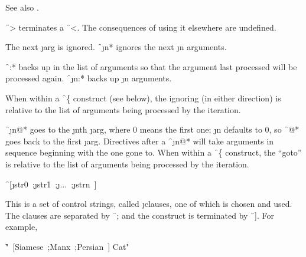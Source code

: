 See also \secref\TildeLessThanLogicalBlock.

\endsubsubsection%




\f{~>} terminates a \f{~<}.
The consequences of using it elsewhere are undefined.

\endsubsubsection%

\endsubsection%




                                                
The next \j{arg} is ignored.
\f{~\j{n}*} ignores the next \j{n} arguments.


\f{~:*} backs up in the list of
arguments so that the argument last processed will be processed again.
\f{~\j{n}:*} backs up \j{n} arguments.


When within a \f{~\{} construct
(see below), the ignoring (in either direction) is relative to the list
of arguments being processed by the iteration.


\f{~\j{n}@*} 
goes to the \j{n}th \j{arg}, where 0 means the first one;
\j{n} defaults to 0, so \f{~@*} goes back to the first \j{arg}.      
Directives after a \f{~\j{n}@*}
will take arguments in sequence beginning with the one gone to.
When within a \f{~\{} construct, the ``goto''
is relative to the list of arguments being processed by the iteration.

\endsubsubsection%



\f{~[\j{str0}~;\j{str1}~;\j{...}~;\j{strn}~]}

This is a set of control strings, called \j{clauses}, one of which is
chosen and used.  The clauses are separated by \f{~;}
and the construct is terminated by \f{~]}.  For example,

\f{"~[Siamese~;Manx~;Persian~] Cat"}
                              
